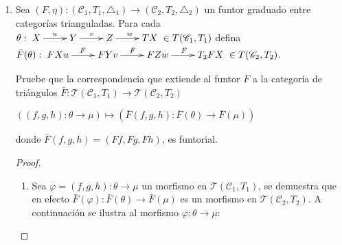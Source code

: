 \documentclass{article}
\newcommand{\cc}{\mathscr{C}}
\begin{document}
\begin{enumerate}
\begin{proof}
 Observemos que $ A\in Obj(\mathscr{D}^{op})\,\,\iff\,\, A\in Obj(\mathscr{D})$, entonces para cada $A\in \mathscr{D}, \,\,
T(A)\in \mathscr{D}$ y $\tilde{T}(A)\in \mathscr{D}^{op}$. Análogamente $T^{-1}(A)\in \mathscr{D}^{op}$.\\

Sea $f:A\to B$ en $\mathscr{D}^{op}$ entonces $\tilde{T}(f)=(T^{-1}(f^{op}))^{op}$ pero $f^{op}:B\to A$ está en $\mathscr{D}$ por lo que
$T^{-1}(f^{op})\in \mathscr{D}$, es decir, $\tilde{T}(f)\in (\mathscr{D})^{op}$. Análogamente $\tilde{T}^{-1}(f)\in (\mathscr{D})^{op}$.\\

 Sea $f:X\to Y$ en $\mathscr{D}^{op}$, ntonces $f^{op}:Y\to X$ en $\mathscr{D}$, por ( ST4 ) sobre $\mathscr{D}$, se tiene que
existe $\eta:\xymatrix{Y\ar[r]^{f^{op}}&X\ar[r]&Z\ar[r]&TY\,\,\in \triangle|_{\mathscr{D}}}$ con $Z$ en $\mathscr{D}$. Así por el teorema ( 1.3 ) 
$\eta_0:\xymatrix{T^{-1}Z\ar[r]&Y\ar[r]^{f^{op}}&X\ar[r]&Z\,\,\in \triangle|_{\mathscr{D}}}$, y por definición de categoría triangulada opuesta\\
$\xymatrix{X\ar[r]^f&Y\ar[r]&\tilde{T}^{-1}Z\ar[r]&\tilde{T}X\,\,\in \triangle|_{\mathscr{D}^{op}}}$.\\

Por lo que $(\mathscr{D},T|_\mathscr{D},\triangle|_\mathscr{D})^{op}$ es subcategoría triangulada de $(\mathscr{C},T,\triangle)^{op}$.

\end{proof}

\item Sea $(F,\eta):(\mathscr{C}_{1},T_{1},\triangle_{1})\to (\mathscr{C}_{2},T_{2},\triangle_{2})$ un funtor graduado entre categor\'ias trianguladas. Para cada $\theta : \xymatrix{X\ar[r]^u & Y\ar[r]^v & Z\ar[r]^w & TX } \in T(\mathscr{C}_{1},T_{1})$ defina $\bar{F}(\theta):\xymatrix{FX\ar[r]^Fu & FY\ar[r]^Fv & FZ\ar[r]^Fw & T_{2}FX } \in T(\mathscr{C}_{2},T_{2})$. 

\bigskip

Pruebe que la correspondencia que extiende al funtor $F$ a la categor\'ia de tri\'angulos $\bar{F} :\mathcal{T}(\mathscr{C}_{1},T_{1})\to \mathcal{T}(\mathscr{C}_{2},T_{2})$
\begin{center}
$((f,g,h):\theta \to \mu)\longmapsto (\bar{F}(f,g,h):\bar{F}(\theta)\to \bar{F}(\mu))$ 
\end{center} 
donde $\bar{F}(f,g,h)=(Ff,Fg,Fh)$, es funtorial.


\begin{proof}
\begin{enumerate}
\item Sea $\varphi=(f,g,h):\theta \to \mu$ un morfismo en $\mathcal{T}(\cc_{1},T_{1})$, se demuestra que en efecto $\bar{F}(\varphi):\bar{F}(\theta) \to \bar{F}(\mu)$ es un morfismo en $\mathcal{T}(\cc_{2},T_{2})$. A continuación se ilustra al morfismo $\varphi:\theta \to \mu$:


\end{enumerate}
\end{proof}
\end{enumerate}
\end{document}
